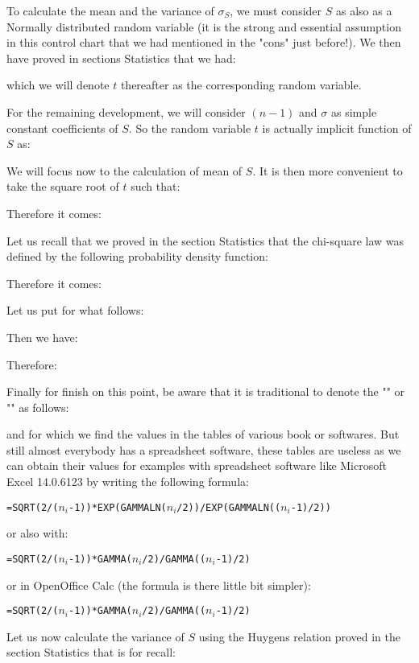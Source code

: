 	To calculate the mean and the variance of $\sigma_S$, we must consider $S$ as also as a Normally distributed random variable (it is the strong and essential assumption in this control chart that we had mentioned in the "cons" just before!). We then have proved in sections Statistics that we had:
	
	which we will denote $t$ thereafter as the corresponding random variable. 

	For the remaining development, we will consider $(n-1)$ and $\sigma$ as simple constant coefficients of $S$. So the random variable $t$ is actually implicit function of $S$ as:
	
	We will focus now to the calculation of mean of $S$. It is then more convenient to take the square root of $t$ such that:
	
	Therefore it comes:
	
	Let us recall that we proved in the section Statistics that the chi-square law was defined by the following probability density function:
	
	Therefore it comes:
	
	Let us put for what follows:
	
	Then we have:
	
	Therefore:
	
	Finally for finish on this point, be aware that it is traditional to denote the "" or "" as follows:
	
	and for which we find the values in the tables of various book or softwares. But still almost everybody has a spreadsheet software, these tables are useless as we can obtain their values for examples with spreadsheet software like Microsoft Excel 14.0.6123 by writing the following formula:
	\begin{center}
		\texttt{=SQRT(2/($n_i$-1))*EXP(GAMMALN($n_i$/2))/EXP(GAMMALN(($n_i$-1)/2))}
	\end{center}
	or also with:
	\begin{center}
		\texttt{=SQRT(2/($n_i$-1))*GAMMA($n_i$/2)/GAMMA(($n_i$-1)/2)}
	\end{center}
	or in OpenOffice Calc (the formula is there little bit simpler):
	\begin{center}
		\texttt{=SQRT(2/($n_i$-1))*GAMMA($n_i$/2)/GAMMA(($n_i$-1)/2)}
	\end{center}
	Let us now calculate the variance of $S$ using the Huygens relation proved in the section Statistics that is for recall:
	
